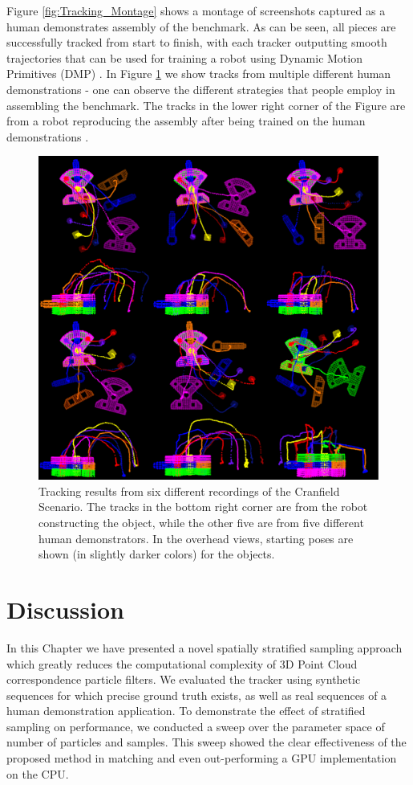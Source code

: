 Figure \ref{fig:Tracking_Montage} shows a montage of screenshots captured as a human demonstrates assembly of the benchmark. As can be seen, all pieces are successfully tracked from start to finish, with each tracker outputting smooth trajectories that can be used for training a robot using Dynamic Motion Primitives (DMP) \cite{Kulvicius2012}. In Figure \ref{fig:TrackingResults} we show tracks from multiple different human demonstrations - one can observe the different strategies that people employ in assembling the benchmark. The tracks in the lower right corner of the Figure are from a robot reproducing the assembly after being trained on the human demonstrations \cite{Rossman_ICRA2014}. 

\begin{figure}[!ht]
  \centering
  \includegraphics[width=1.0\textwidth]{figures/Tracking/TracksMontage.pdf}
  \caption[Snapshots from Virtual Reality Benchmark Run]{Tracking results from six different recordings of the Cranfield Scenario. The tracks in the bottom right corner are from the robot constructing the object, while the other five are from five different human demonstrators. In the overhead views, starting poses are shown (in slightly darker colors) for the objects.}
  \label{fig:TrackingResults}
\end{figure}

\section{Discussion}
In this Chapter we have presented a novel spatially stratified sampling approach which greatly reduces the computational complexity of 3D Point Cloud correspondence particle filters. We evaluated the tracker using synthetic sequences for which precise ground truth exists, as well as real sequences of a human demonstration application. To demonstrate the effect of stratified sampling on performance, we conducted a sweep over the parameter space of number of particles and samples. This sweep showed the clear effectiveness of the proposed method in matching and even out-performing a GPU implementation on the CPU. 

